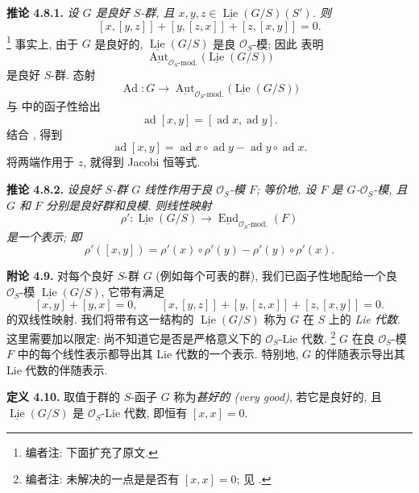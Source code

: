 \medskip
\noindent{}\textbf{推论 4.8.1.}
\textit{设 \(G\) 是良好 \(S\)-群, 且
\(x,y,z\in\underline{\operatorname{Lie}}(G/S)(S')\). 则}
\[
 [x,[y,z]]+[y,[z,x]]+[z,[x,y]]=0.
\]
\footnote{编者注: 下面扩充了原文.}
事实上, 由于 \(G\) 是良好的,
\(\underline{\operatorname{Lie}}(G/S)\) 是良
\(\mathcal O_S\)-模; 因此  表明
\[
 \underline{\operatorname{Aut}}_{\mathcal O_S\text{-mod.}}
   \bigl(\underline{\operatorname{Lie}}(G/S)\bigr)
\]
是良好 \(S\)-群. 态射
\[
 \operatorname{Ad}:G\longrightarrow
 \underline{\operatorname{Aut}}_{\mathcal O_S\text{-mod.}}
  \bigl(\underline{\operatorname{Lie}}(G/S)\bigr)
\]
与  中的函子性给出
\[
 \operatorname{ad}[x,y]
 =[\operatorname{ad}x,\operatorname{ad}y].
\]
结合 , 得到
\[
 \operatorname{ad}[x,y]
 =\operatorname{ad}x\circ\operatorname{ad}y
  -\operatorname{ad}y\circ\operatorname{ad}x.
\]
将两端作用于 \(z\), 就得到 Jacobi 恒等式.

\medskip
\noindent{}\textbf{推论 4.8.2.}
\textit{设良好 \(S\)-群 \(G\) 线性作用于良
\(\mathcal O_S\)-模 \(F\); 等价地, 设 \(F\) 是
\(G\)-\(\mathcal O_S\)-模, 且 \(G\) 和 \(F\) 分别是良好群和良模.
则线性映射}
\[
 \rho':\underline{\operatorname{Lie}}(G/S)
 \longrightarrow
 \underline{\operatorname{End}}_{\mathcal O_S\text{-mod.}}(F)
\]
\textit{是一个表示; 即}
\[
 \rho'([x,y])
 =\rho'(x)\circ\rho'(y)-\rho'(y)\circ\rho'(x).
\]

\medskip
\noindent{}\textbf{附论 4.9.}
对每个良好 \(S\)-群 \(G\) (例如每个可表的群),
我们已函子性地配给一个良 \(\mathcal O_S\)-模
\(\underline{\operatorname{Lie}}(G/S)\), 它带有满足
\[
 [x,y]+[y,x]=0,
 \qquad
 [x,[y,z]]+[y,[z,x]]+[z,[x,y]]=0.
\]
的双线性映射. 我们将带有这一结构的
\(\underline{\operatorname{Lie}}(G/S)\) 称为 \(G\) 在 \(S\) 上的
\emph{Lie 代数}. 这里需要加以限定: 尚不知道它是否是严格意义下的
\(\mathcal O_S\)-Lie 代数.
\footnote{编者注: 未解决的一点是是否有 \([x,x]=0\);
见 .}
\(G\) 在良 \(\mathcal O_S\)-模 \(F\) 中的每个线性表示都导出其
Lie 代数的一个表示. 特别地, \(G\) 的伴随表示导出其 Lie 代数的伴随表示.

\medskip
\noindent{}\textbf{定义 4.10.}
取值于群的 \(S\)-函子 \(G\) 称为\emph{甚好的 (very good)},
若它是良好的, 且 \(\underline{\operatorname{Lie}}(G/S)\) 是
\(\mathcal O_S\)-Lie 代数, 即恒有 \([x,x]=0\).

